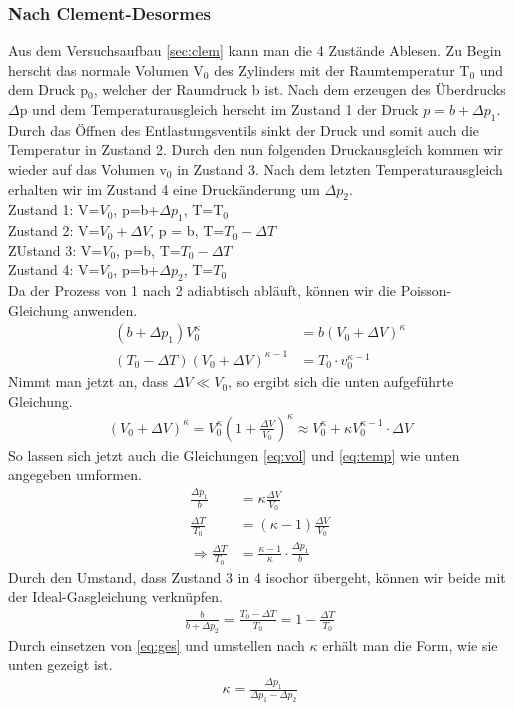 \documentclass[12pt,a4paper,titlepage,headinclude,bibtotoc]{scrartcl}
\begin{document}
\subsubsection{Nach Clement-Desormes}
Aus dem Versuchsaufbau \ref{sec:clem} kann man die 4 Zustände Ablesen.
Zu Begin herscht das normale Volumen V$_0$ des Zylinders mit der Raumtemperatur T$_0$ und dem Druck p$_0$, welcher der Raumdruck b ist.
Nach dem erzeugen des Überdrucks $\Delta$p und dem Temperaturausgleich herscht im Zustand 1 der Druck $p=b+\Delta p_1$.
Durch das Öffnen des Entlastungsventils sinkt der Druck und somit auch die Temperatur in Zustand 2.
Durch den nun folgenden Druckausgleich kommen wir wieder auf das Volumen v$_0$ in Zustand 3.
Nach dem letzten Temperaturausgleich erhalten wir im Zustand 4 eine Druckänderung um $\Delta p_2$.\\
Zustand 1: V=$V_0$, p=b+$\Delta p_1$, T=T$_0$\\
Zustand 2: V=$V_0+\Delta V$, p = b, T=$T_0-\Delta T$\\
ZUstand 3: V=$V_0$, p=b, T=$T_0-\Delta T$\\
Zustand 4: V=$V_0$, p=b+$\Delta p_2$, T=$T_0$\\

Da der Prozess von 1 nach 2 adiabtisch abläuft, können wir die Poisson-Gleichung anwenden.
\begin{align}
	(b+\Delta p_1)V_0^\kappa &= b(V_0 + \Delta V)^\kappa\label{eq:vol}\\
	(T_0-\Delta T)(V_0+\Delta V)^{\kappa-1}&=T_0\cdot v_0^{\kappa-1}\label{eq:temp}
\end{align}
Nimmt man jetzt an, dass $\Delta V \ll V_0$, so ergibt sich die unten aufgeführte Gleichung.
\begin{align}
	(V_0+\Delta V)^\kappa=V_0^\kappa\left(1+\frac{\Delta V}{V_0}\right)^\kappa \approx V_0^\kappa+\kappa V_0^{\kappa-1}\cdot \Delta V
\end{align}
So lassen sich jetzt auch die Gleichungen \eqref{eq:vol} und \eqref{eq:temp} wie unten angegeben umformen.
\begin{align}
	\frac{\Delta p_1}{b}&=\kappa\frac{\Delta V}{V_0}\\
	\frac{\Delta T}{T_0}&=(\kappa-1)\frac{\Delta V}{V_0}\\
	\Rightarrow \frac{\Delta T}{T_0}&=\frac{\kappa -1}{\kappa}\cdot\frac{\Delta p_1}{b}\label{eq:ges}
\end{align}
Durch den Umstand, dass Zustand 3 in 4 isochor übergeht, können wir beide mit der Ideal-Gasgleichung verknüpfen.
\begin{align}
	\frac{b}{b+\Delta p_2}=\frac{T_0-\Delta T}{T_0}=1-\frac{\Delta T}{T_0}
\end{align}
Durch einsetzen von \eqref{eq:ges} und umstellen nach $\kappa$ erhält man die Form, wie sie unten gezeigt ist.
\begin{align}
	\kappa=\frac{\Delta p_1}{\Delta p_1-\Delta p_2}\label{eq:clem}
\end{align}
\end{document}
